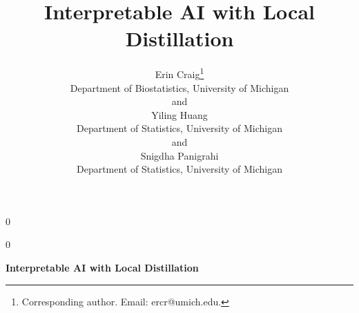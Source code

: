 \documentclass[12pt]{article}
\theoremstyle{definition}
\newcommand{\blind}{0}
\begin{document}
%

\def\spacingset#1{\renewcommand{\baselinestretch}%
{#1}\small\normalsize} \spacingset{1}



\blind
{
  \title{\bf Interpretable AI with Local Distillation}
  \author{Erin Craig\thanks{Corresponding author. Email: ercr@umich.edu.}\hspace{.2cm}\\
    Department of Biostatistics, University of Michigan\\
    and \\
    Yiling Huang\\
    Department of Statistics, University of Michigan\\
    and \\
    Snigdha Panigrahi\\
    Department of Statistics, University of Michigan\\
    }
  \maketitle
} \fi

\blind
{
  \bigskip
  \bigskip
  \bigskip
  \begin{center}
    {\LARGE\bf Interpretable AI with Local Distillation}
\end{center}
  \medskip
} \fi

\bigskip
\end{document}

